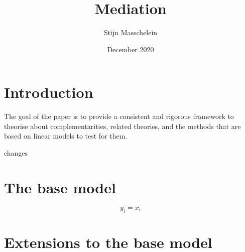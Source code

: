 \documentclass[]{article} %
\title{Mediation}
\author{Stijn Masschelein}
\date{December 2020}
\begin{document}
\maketitle

\section{Introduction}
The goal of the paper is to provide a consistent and rigorous framework to theorise about complementarities, related theories, and the methods that are based on linear models to test for them. 

changes

\section{The base model}

\begin{equation}
\label{eq:management-function}
y_i = x_i 
\end{equation}

\section{Extensions to the base model}
\end{document}
